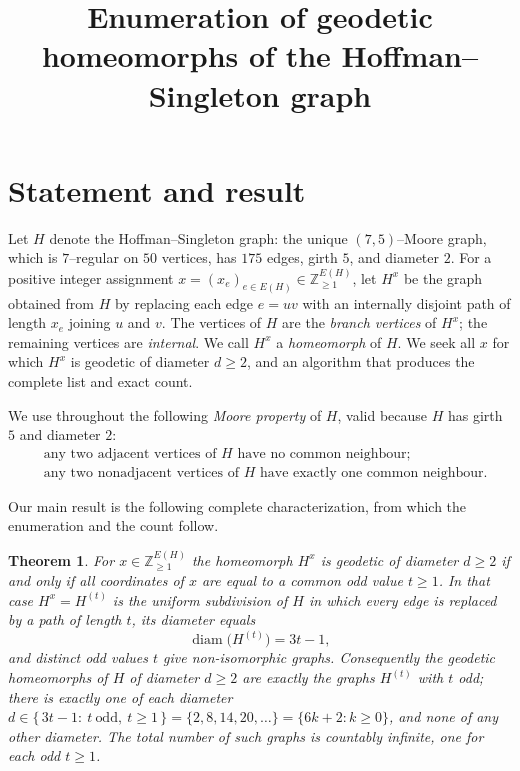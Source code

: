 \documentclass{amsart}
\theoremstyle{plain}
\newtheorem{theorem}{Theorem}
\theoremstyle{definition}
\begin{document}
\title{Enumeration of geodetic homeomorphs of the Hoffman--Singleton graph}
\maketitle

\section{Statement and result}

Let $H$ denote the Hoffman--Singleton graph: the unique $(7,5)$--Moore graph,
which is $7$--regular on $50$ vertices, has $175$ edges, girth $5$, and diameter
$2$. For a positive integer assignment $x=(x_e)_{e\in E(H)}\in\mathbb{Z}_{\ge1}^{E(H)}$,
let $H^{x}$ be the graph obtained from $H$ by replacing each edge $e=uv$ with an
internally disjoint path of length $x_e$ joining $u$ and $v$. The vertices of $H$
are the \emph{branch vertices} of $H^x$; the remaining vertices are \emph{internal}.
We call $H^x$ a \emph{homeomorph} of $H$. We seek all $x$ for which $H^x$ is
geodetic of diameter $d\ge2$, and an algorithm that produces the complete list and
exact count.

We use throughout the following \emph{Moore property} of $H$, valid because $H$
has girth $5$ and diameter $2$:
\begin{equation}\label{eq:moore}
\begin{aligned}
&\text{any two adjacent vertices of }H\text{ have no common neighbour;}\\
&\text{any two nonadjacent vertices of }H\text{ have exactly one common neighbour.}
\end{aligned}
\end{equation}

Our main result is the following complete characterization, from which the
enumeration and the count follow.

\begin{theorem}\label{thm:main}
For $x\in\mathbb{Z}_{\ge1}^{E(H)}$ the homeomorph $H^x$ is geodetic of diameter
$d\ge2$ \emph{if and only if} all coordinates of $x$ are equal to a common
\emph{odd} value $t\ge1$. In that case $H^x=H^{(t)}$ is the uniform subdivision of
$H$ in which every edge is replaced by a path of length $t$, its diameter equals
\begin{equation}\label{eq:diam}
\operatorname{diam}\bigl(H^{(t)}\bigr)=3t-1,
\end{equation}
and distinct odd values $t$ give non-isomorphic graphs. Consequently the geodetic
homeomorphs of $H$ of diameter $d\ge2$ are exactly the graphs $H^{(t)}$ with $t$ odd;
there is exactly one of each diameter
$d\in\{\,3t-1:\ t\ \text{odd},\ t\ge1\,\}=\{2,8,14,20,\dots\}=\{6k+2:k\ge0\}$,
and none of any other diameter. The total number of such graphs is countably infinite,
one for each odd $t\ge1$.
\end{theorem}
\end{document}

